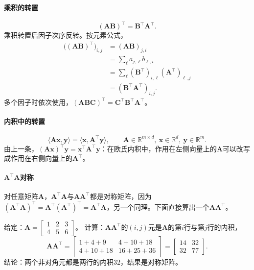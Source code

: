 \paragraph{乘积的转置}
\[
 (\bm A\bm B)^\top=\bm B^\top\bm A^\top.
\]
乘积转置后因子次序反转。按元素公式，
\[
 \begin{aligned}
 \bigl((\bm A\bm B)^\top\bigr)_{i,j}
 &=(\bm A\bm B)_{j,i}\\
 &=\sum_\ell a_{j,\ell}b_{\ell,i}\\
 &=\sum_\ell(\bm B^\top)_{i,\ell}(\bm A^\top)_{\ell,j}\\
 &=(\bm B^\top\bm A^\top)_{i,j}.
 \end{aligned}
\]
多个因子时依次使用，$(\bm A\bm B\bm C)^\top=\bm C^\top\bm B^\top\bm A^\top$。

\paragraph{内积中的转置}
\[
\langle\bm A\bm x,\bm y\rangle=\langle\bm x,\bm A^\top\bm y\rangle,\qquad
\bm A\in\mathbb R^{m\times d},\ \bm x\in\mathbb R^d,\ \bm y\in\mathbb R^m.
\]
由上一条，$(\bm A\bm x)^\top\bm y=\bm x^\top\bm A^\top\bm y$：在欧氏内积中，作用在左侧向量上的$\bm A$可以改写成作用在右侧向量上的$\bm A^\top$。

\paragraph{$\bm A^\top\bm A$对称}
对任意矩阵$\bm A$，$\bm A^\top\bm A$与$\bm A\bm A^\top$都是对称矩阵，因为$(\bm A^\top\bm A)^\top=\bm A^\top(\bm A^\top)^\top=\bm A^\top\bm A$，另一个同理。下面直接算出一个$\bm A\bm A^\top$。
\begin{example}[计算$\bm A\bm A^\top$]
\label{ex:ls-gram-product-symmetric}
给定：$\bm A=\left[\begin{smallmatrix}1&2&3\\4&5&6\end{smallmatrix}\right]$。
计算：$\bm A\bm A^\top$的$(i,j)$元是$\bm A$的第$i$行与第$j$行的内积，
\[
 \bm A\bm A^\top=\begin{bmatrix}1+4+9&4+10+18\\4+10+18&16+25+36\end{bmatrix}=\begin{bmatrix}14&32\\32&77\end{bmatrix}.
\]
结论：两个非对角元都是两行的内积$32$，结果是对称矩阵。
\end{example}

